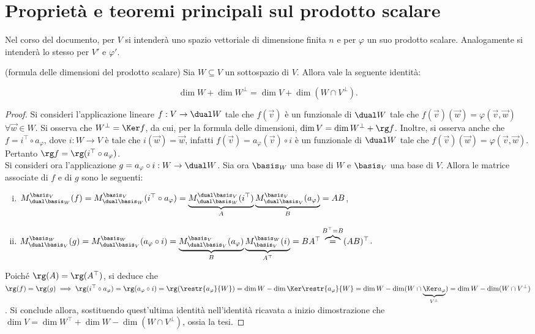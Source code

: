\chapter{Proprietà e teoremi principali sul prodotto scalare}
	
\begin{note}
	Nel corso del documento, per $V$ si intenderà uno spazio vettoriale di dimensione
	finita $n$ e per $\varphi$ un suo prodotto scalare. Analogamente si intenderà lo stesso
	per $V'$ e $\varphi'$.
\end{note}

\begin{proposition} (formula delle dimensioni del prodotto scalare)
	Sia $W \subseteq V$ un sottospazio di $V$. Allora vale la seguente identità:
	
	\[ \dim W + \dim W^\perp = \dim V + \dim (W \cap V^\perp). \]
\end{proposition}

\begin{proof}
	Si consideri l'applicazione lineare $f : V \to \dual W$ tale che $f(\vec v)$ è un funzionale di $\dual W$ tale che
	$f(\vec v)(\vec w) = \varphi(\vec v, \vec w)$ $\forall \vec w \in W$. Si osserva che $W^\perp = \Ker f$, da cui,
	per la formula delle dimensioni, $\dim V = \dim W^\perp + \rg f$. Inoltre, si osserva anche che
	$f = i^\top \circ a_\varphi$, dove $i : W \to V$ è tale che $i(\vec w) = \vec w$, infatti $f(\vec v) = a_\varphi(\vec v) \circ i$ è un funzionale di $\dual W$ tale che $f(\vec v)(\vec w) = \varphi(\vec v, \vec w)$. Pertanto
	$\rg f = \rg (i^\top \circ a_\varphi)$. \\
	
	Si consideri ora l'applicazione $g = a_\varphi \circ i : W \to \dual W$. Sia ora $\basis_W$ una base di $W$ e
	$\basis_V$ una base di $V$. Allora le matrice associate di $f$ e di $g$ sono le seguenti:
	
	\begin{enumerate}[(i)]
		\item $M_{\dual \basis_W}^{\basis_V}(f) = M_{\dual \basis_W}^{\basis_V}(i^\top \circ a_\varphi) =
		\underbrace{M_{\dual \basis_W}^{\dual \basis_V}(i^\top)}_A \underbrace{M_{\dual \basis_V}^{\basis_V}(a_\varphi)}_B = AB$,
		\item $M_{\dual \basis_V}^{\basis_W}(g) = M_{\dual \basis_V}^{\basis_W}(a_\varphi \circ i) =
		\underbrace{M_{\dual \basis_V}^{\basis_V}(a_\varphi)}_B \underbrace{M_{\basis_V}^{\basis_W}(i)}_{A^\top} = BA^\top \overbrace{=}^{B^\top = B} (AB)^\top$.
	\end{enumerate}
	
	Poiché $\rg(A) = \rg(A^\top)$, si deduce che $\rg(f) = \rg(g) \implies \rg(i^\top \circ a_\varphi) = \rg(a_\varphi \circ i) = \rg(\restr{a_\varphi}{W}) = \dim W - \dim \Ker \restr{a_\varphi}{W} = \dim W - \dim (W \cap \underbrace{\Ker a_\varphi}_{V^\perp}) = \dim W - \dim (W \cap V^\perp)$. Si conclude allora, sostituendo quest'ultima
	identità nell'identità ricavata a inizio dimostrazione che $\dim V = \dim W^\top + \dim W - \dim (W \cap V^\perp)$,
	ossia la tesi.
\end{proof}

